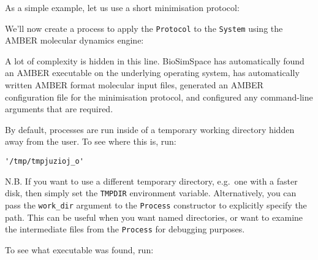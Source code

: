 As a simple example, let us use a short minimisation protocol:

\begin{Shaded}
\begin{Highlighting}[]
\OperatorTok{=}\OperatorTok{=}\NormalTok{)}
\end{Highlighting}
\end{Shaded}

We'll now create a process to apply the \texttt{Protocol} to the
\texttt{System} using the AMBER molecular dynamics engine:

\begin{Shaded}
\begin{Highlighting}[]
\OperatorTok{=}
\end{Highlighting}
\end{Shaded}

A lot of complexity is hidden in this line. BioSimSpace has
automatically found an AMBER executable on the underlying operating
system, has automatically written AMBER format molecular input files,
generated an AMBER configuration file for the minimisation protocol, and
configured any command-line arguments that are required.

By default, processes are run inside of a temporary working directory
hidden away from the user. To see where this is, run:

\begin{Shaded}
\begin{Highlighting}[]
\end{Highlighting}
\end{Shaded}

\begin{verbatim}
'/tmp/tmpjuzioj_o'
\end{verbatim}

N.B. If you want to use a different temporary directory, e.g.~one with a
faster disk, then simply set the \texttt{TMPDIR} environment variable.
Alternatively, you can pass the \texttt{work\_dir} argument to the
\texttt{Process} constructor to explicitly specify the path. This can be
useful when you want named directories, or want to examine the
intermediate files from the \texttt{Process} for debugging purposes.

To see what executable was found, run:

\begin{Shaded}
\begin{Highlighting}[]
\end{Highlighting}
\end{Shaded}

